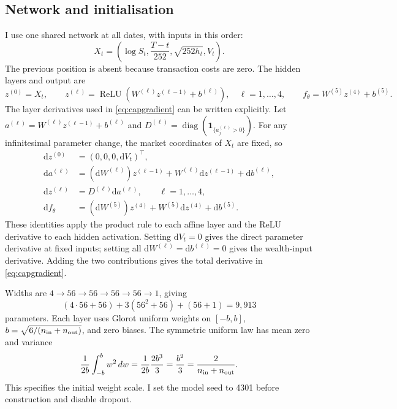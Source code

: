 \documentclass[11pt,a4paper]{article}
\newcommand{\ind}{\mathbf 1}
\newcommand{\relu}{\operatorname{ReLU}}
\theoremstyle{remark}
\begin{document}
\subsection{Network and initialisation}
I use one shared network at all dates, with inputs in this order:
\begin{equation}
 X_t=\left(\log S_t,\frac{T-t}{252},\sqrt{252h_t},V_t\right).
 \label{eq:features}
\end{equation}
The previous position is absent because transaction costs are zero. The hidden layers and output are
\begin{equation}
 z^{(0)}=X_t,\qquad
 z^{(\ell)}=\relu(W^{(\ell)}z^{(\ell-1)}+b^{(\ell)}),\quad \ell=1,\ldots,4,
 \qquad f_\theta=W^{(5)}z^{(4)}+b^{(5)}.
\end{equation}
The layer derivatives used in \eqref{eq:capgradient} can be written explicitly. Let
$a^{(\ell)}=W^{(\ell)}z^{(\ell-1)}+b^{(\ell)}$ and
$D^{(\ell)}=\operatorname{diag}(\ind_{\{a^{(\ell)}_j>0\}})$.
For any infinitesimal parameter change, the market coordinates of $X_t$ are fixed, so
\begin{align}
 \mathrm dz^{(0)}&=(0,0,0,\mathrm dV_t)^\top,\nonumber\\
 \mathrm da^{(\ell)}
 &= (\mathrm dW^{(\ell)})z^{(\ell-1)}
       +W^{(\ell)}\mathrm dz^{(\ell-1)}
       +\mathrm db^{(\ell)},\nonumber\\
 \mathrm dz^{(\ell)}&=D^{(\ell)}\mathrm da^{(\ell)},
       \qquad \ell=1,\ldots,4,\nonumber\\
 \mathrm df_\theta
 &= (\mathrm dW^{(5)})z^{(4)}
       +W^{(5)}\mathrm dz^{(4)}+\mathrm db^{(5)}.
\end{align}
These identities apply the product rule to each affine layer and the ReLU derivative to each hidden activation. Setting $\mathrm dV_t=0$ gives the direct parameter derivative at fixed inputs; setting all $\mathrm dW^{(\ell)}=\mathrm db^{(\ell)}=0$ gives the wealth-input derivative. Adding the two contributions gives the total derivative in \eqref{eq:capgradient}.

Widths are $4\to56\to56\to56\to56\to1$, giving
\begin{equation}
 (4\cdot56+56)+3(56^2+56)+(56+1)=9,913
\end{equation}
parameters. Each layer uses Glorot uniform weights on $[-b,b]$, $b=\sqrt{6/(n_{\rm in}+n_{\rm out})}$, and zero biases. The symmetric uniform law has mean zero and variance
\begin{equation}
 \frac1{2b}\int_{-b}^b w^2\,dw
 =\frac1{2b}\frac{2b^3}{3}=\frac{b^2}{3}
 =\frac{2}{n_{\rm in}+n_{\rm out}}.
\end{equation}
This specifies the initial weight scale. I set the model seed to 4301 before construction and disable dropout.
\end{document}
